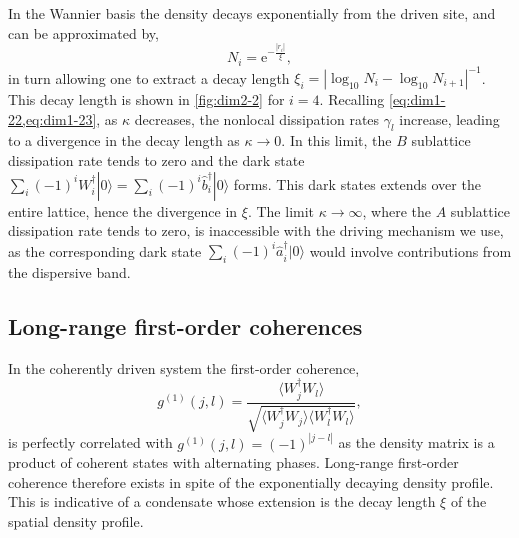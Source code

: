In the Wannier basis the density decays exponentially from the driven site, and can be approximated by,
\begin{equation}
	N_{i} = \mathrm{e}^{-\frac{|r_{i}|}{\xi}},
	\label{eq:dim2-4}
\end{equation}
in turn allowing one to extract a decay length \(\xi_{i} = |\log_{10}N_{i} - \log_{10}N_{i+1}|^{-1}\). This decay length is shown in \cref{fig:dim2-2} for \(i=4\). Recalling \cref{eq:dim1-22,eq:dim1-23}, as \(\kappa\) decreases, the nonlocal dissipation rates \(\gamma_{l}\) increase, leading to a divergence in the decay length as \(\kappa \rightarrow 0\). In this limit, the \(B\) sublattice dissipation rate tends to zero and the dark state \(\sum_{i} (-1)^{i}W_{i}^{\dagger}|0\rangle = \sum_{i}(-1)^{i}\hat{b}_{i}^{\dagger}|0\rangle\) forms. This dark states extends over the entire lattice, hence the divergence in \(\xi\). The limit \(\kappa \rightarrow \infty\), where the \(A\) sublattice dissipation rate tends to zero, is inaccessible with the driving mechanism we use, as the corresponding dark state \(\sum_{i}(-1)^{i}\hat{a}_{i}^{\dagger}|0\rangle\) would involve contributions from the dispersive band.  

\subsection{Long-range first-order coherences}
In the coherently driven system the first-order coherence,
\begin{equation}
	g^{(1)}(j,l) = \frac{\langle W_{j}^{\dagger}W_{l} \rangle}{\sqrt{\langle W_{j}^{\dagger}W_{j} \rangle \langle W_{l}^{\dagger}W_{l} \rangle}},
	\label{eq:dim2-5}
\end{equation}
is perfectly correlated with \(g^{(1)}(j,l) = (-1)^{|j-l|}\) as the density matrix is a product of coherent states with alternating phases. Long-range first-order coherence therefore exists in spite of the exponentially decaying density profile. This is indicative of a condensate whose extension is the decay length \(\xi\) of the spatial density profile. 

